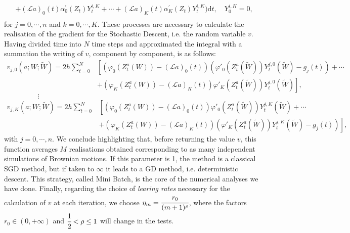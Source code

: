 \documentclass[a4paper,11pt,openright]{report}
\begin{document}
\begin{itemize}
\begin{equation*}
\begin{aligned}
&+ (\mathcal{L}a)_0(t) \alpha^\prime_0(Z_t)  Y^{i,K}_t + \cdots + (\mathcal{L}a)_K(t) \alpha^\prime_K(Z_t)  Y^{i,K}_t\bigr) \textrm{d} t, \quad Y^{i,K}_0 = 0,\\
\end{aligned}
\end{equation*}
for $j = 0, \cdots , n$ and $k =0, \cdots, K$.
These processes are necessary to calculate the realisation of the gradient for the Stochastic Descent, i.e. the random variable $v$. Having divided time into $N$ time steps and approximated the integral with a summation the writing of $v$, component by component, is as follows:
\begin{equation*}
\begin{aligned}
v_{j,0}(a; W; \tilde{W}) = 2 h \sum_{t=0}^{N} &\left[\left( \varphi_0(Z^a_t(W)) - (\mathcal{L}a)_0(t) \right) \left( \varphi'_0(Z^a_t(\tilde{W})) Y^{j,0}_t(\tilde{W}) - g_j(t)\right) + \cdots \right. \\
&+ \left. \left( \varphi_K(Z^a_t(W)) - (\mathcal{L}a)_K(t) \right)  \varphi'_K(Z^a_t(\tilde{W})) Y^{j,0}_t(\tilde{W})\right],
\end{aligned}
\end{equation*}
$\hspace{2cm} \vdots$
\begin{equation*}
\begin{aligned}
v_{j,K}(a; W; \tilde{W}) = 2 h \sum_{t=0}^{N} & \left[ \left( \varphi_0(Z^a_t(W)) - (\mathcal{L}a)_0(t) \right) \varphi'_0(Z^a_t(\tilde{W})) Y^{j,K}_t(\tilde{W}) + \cdots \right. \\
&+  \left. \left( \varphi_K(Z^a_t(W)) - (\mathcal{L}a)_K(t) \right) \left( \varphi'_K(Z^a_t(\tilde{W})) Y^{j,K}_t(\tilde{W}) - g_j(t) \right) \right], 
\end{aligned}
\end{equation*}
with $j = 0, \cdots , n$. We conclude highlighting that, before returning the value $v$, this function averages $M$ realisations obtained corresponding to as many independent simulations of Brownian motions. If this parameter is 1, the method is a classical SGD method, but if taken to $\infty$ it leads to a GD method, i.e. deterministic descent. This strategy, called Mini Batch, is the core of the numerical analyses we have done. Finally, regarding the choice of \emph{learing  rates} necessary for the calculation of $v$ at each iteration, we choose $\eta_m = \cfrac{r_0}{(m + 1)^\rho}$, where the factors $r_0 \in (0, +\infty)$ and $\cfrac{1}{2} < \rho \leq 1$ will change in the tests.
\end{itemize}
\end{document}
